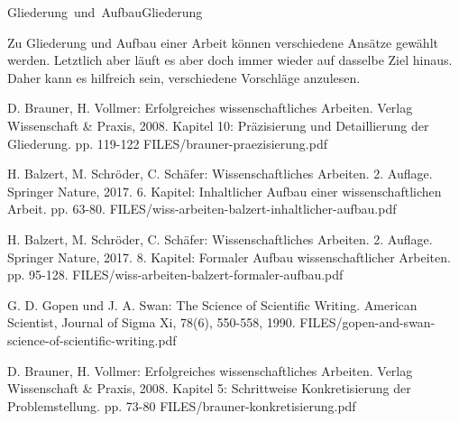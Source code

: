 



\unit{Gliederung und Aufbau}{Gliederung}


Zu Gliederung und Aufbau einer Arbeit können verschiedene Ansätze gewählt werden.
Letztlich aber läuft es aber doch immer wieder auf dasselbe Ziel hinaus.
Daher kann es hilfreich sein, verschiedene Vorschläge anzulesen.


{D. Brauner, H. Vollmer: Erfolgreiches wissenschaftliches Arbeiten.
Verlag Wissenschaft \& Praxis, 2008.
Kapitel 10: Präzisierung und Detaillierung der Gliederung.
pp. 119-122}
{FILES/brauner-praezisierung.pdf}
{}


{H. Balzert, M. Schröder, C. Schäfer: Wissenschaftliches
Arbeiten. 2. Auflage.
Springer Nature, 2017. 6. Kapitel: Inhaltlicher Aufbau einer wissenschaftlichen Arbeit.
pp. 63-80.}
{FILES/wiss-arbeiten-balzert-inhaltlicher-aufbau.pdf}
{}



{H. Balzert, M. Schröder, C. Schäfer: Wissenschaftliches
Arbeiten. 2. Auflage.
Springer Nature, 2017. 8. Kapitel: Formaler Aufbau wissenschaftlicher Arbeiten.
pp. 95-128.}
{FILES/wiss-arbeiten-balzert-formaler-aufbau.pdf}
{}

{G. D. Gopen und J. A. Swan: The Science of Scientific Writing. American Scientist, 
Journal of Sigma Xi, 78(6), 550-558, 1990.}
{FILES/gopen-and-swan-science-of-scientific-writing.pdf}
{}



{D. Brauner, H. Vollmer: Erfolgreiches wissenschaftliches Arbeiten.
Verlag Wissenschaft \& Praxis, 2008.
Kapitel 5: Schrittweise Konkretisierung der Problemstellung.
pp. 73-80}
{FILES/brauner-konkretisierung.pdf}
{}









